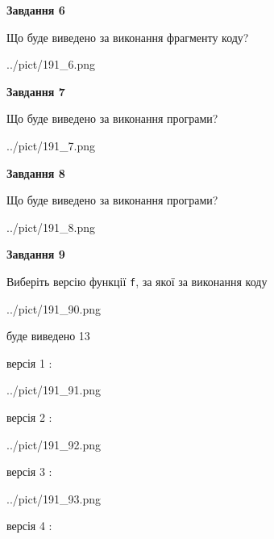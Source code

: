 \documentclass[12pt, ukrainian]{article}
\def\code#1{\Verb!#1!}
\begin{document}
{\begin {large}
{\begin {center}\textbf{Завдання 6}\end {center}}

Що буде виведено за виконання фрагменту коду?\par
\begin{center}
	{../pict/191_6.png}
\end{center}
\newpage

{\begin {center}\textbf{Завдання 7}\end {center}}

Що буде виведено за виконання програми?\par
\begin{center}
	{../pict/191_7.png}
\end{center}
\newpage

{\begin {center}\textbf{Завдання 8}\end {center}}

Що буде виведено за виконання програми?\par
\begin{center}
	{../pict/191_8.png}
\end{center}
\newpage

{\begin {center}\textbf{Завдання 9}\end {center}}

Виберіть версію функції \code{f}, за якої за виконання коду
\begin{center}
	{../pict/191_90.png}
\end{center}
буде виведено 13

\vspace{5mm}
версія 1 :

\begin{center}
	{../pict/191_91.png}
\end{center}
версія 2 :

\begin{center}
	{../pict/191_92.png}
\end{center}
версія 3 :

\begin{center}
	{../pict/191_93.png}
\end{center}
версія 4 :


\end{large}}
\end{document}
